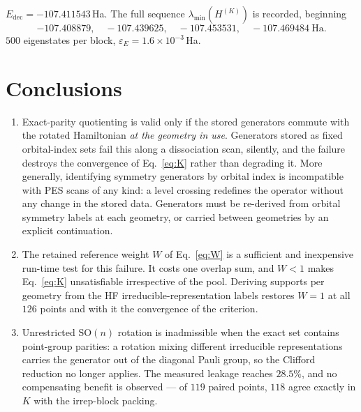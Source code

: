 \documentclass[11pt]{article}
\newcommand{\Edec}{E_{\mathrm{dec}}}
\begin{document}
\begin{description}[leftmargin=1.6em,style=nextline,itemsep=3pt]
\item[Decoupled energy and coupled dimension.]
$\Edec=-107.411543$\,Ha. The full sequence $\lambda_{\min}(H^{(K)})$ is
recorded, beginning
\[
-107.408879,\quad -107.439625,\quad -107.453531,\quad -107.469484\ \mathrm{Ha}.
\]
$500$ eigenstates per block, $\varepsilon_E=1.6\times10^{-3}$\,Ha.

\end{description}

\section{Conclusions}
\label{sec:conclusions}

\begin{enumerate}[leftmargin=1.8em,itemsep=4pt]

\item Exact-parity quotienting is valid only if the stored generators commute
  with the rotated Hamiltonian \emph{at the geometry in use}. Generators stored
  as fixed orbital-index sets fail this along a dissociation scan, silently,
  and the failure destroys the convergence of Eq.~\eqref{eq:K} rather than
  degrading it. More generally, identifying symmetry generators by orbital
  index is incompatible with PES scans of any kind: a level crossing
  redefines the operator without any change in the stored data. Generators must
  be re-derived from orbital symmetry labels at each geometry, or carried
  between geometries by an explicit continuation.

\item The retained reference weight $W$ of Eq.~\eqref{eq:W} is a sufficient and
  inexpensive run-time test for this failure. It costs one overlap sum, and
  $W<1$ makes Eq.~\eqref{eq:K} unsatisfiable irrespective of the pool. Deriving
  supports per geometry from the HF irreducible-representation labels restores
  $W=1$ at all $126$ points and with it the convergence of the criterion.

\item Unrestricted $\mathrm{SO}(n)$ rotation is inadmissible when the exact set
  contains point-group parities: a rotation mixing different irreducible
  representations carries the generator out of the diagonal Pauli group, so the
  Clifford reduction no longer applies. The measured leakage reaches $28.5\%$,
  and no compensating benefit is observed --- of $119$ paired points, $118$
  agree exactly in $K$ with the irrep-block packing.


\end{enumerate}
\end{document}
